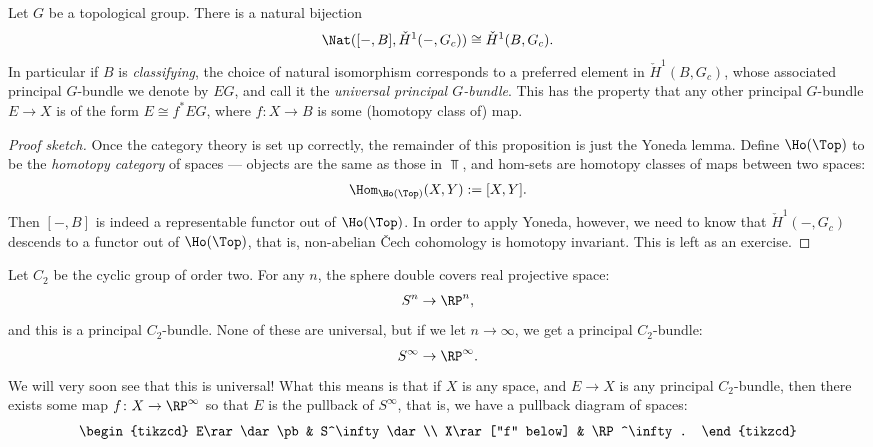 \documentclass[11pt]{book}
\begin{document}
\begin{proposition}\label{prop:classifying-bundle}
Let $G$ be a topological group. There is a natural bijection
\[
\Nat([-,B], \check{H}^1(-,G_c)) \cong \check{H}^1(B,G_c).
\]
In particular if $B$ is \emph{classifying}, the choice of natural isomorphism corresponds to a preferred element in $\check{H}^1(B,G_c)$, whose associated principal $G$-bundle we denote by $EG$, and call it the \emph{universal principal $G$-bundle}. This has the property that any other principal $G$-bundle $E\to X$ is of the form $E\cong f^\ast EG$, where $f\colon X \to B$ is some (homotopy class of) map.
\end{proposition}
\begin{proof}[Proof sketch] Once the category theory is set up correctly, the remainder of this proposition is just the Yoneda lemma. Define $\Ho(\Top)$ to be the \emph{homotopy category} of spaces --- objects are the same as those in $\Top$, and hom-sets are homotopy classes of maps between two spaces:
\begin{align*}
    \Hom_{\Ho(\Top)}(X,Y) := [X,Y].
\end{align*}
Then $[-,B]$ is indeed a representable functor out of $\Ho(\Top)$. In order to apply Yoneda, however, we need to know that $\check{H}^1(-,G_c)$ descends to a functor out of $\Ho(\Top)$, that is, non-abelian \v{C}ech cohomology is homotopy invariant. This is left as an exercise.
\end{proof}

\begin{example}
\label{exa:universal-c2-bundle}    
Let $C_2$ be the cyclic group of order two. For any $n$, the sphere double covers real projective space:
\begin{align*}
    S^n \to \RP^n,
\end{align*}
and this is a principal $C_2$-bundle. None of these are universal, but if we let $n\to \infty$, we get a principal $C_2$-bundle:
\begin{align*}
    S^\infty \to \RP^\infty.
\end{align*}
We will very soon see that this is universal! What this means is that if $X$ is any space, and $E\to X$ is any principal $C_2$-bundle, then there exists some map $f \colon X \to \RP^\infty$ so that $E$ is the pullback of $S^\infty$, that is, we have a pullback diagram of spaces:
\[
\begin{tikzcd}
    E\rar\dar\pb & S^\infty\dar \\
    X\rar["f" below] & \RP^\infty.
\end{tikzcd}
\]
\end{example}
\end{document}
